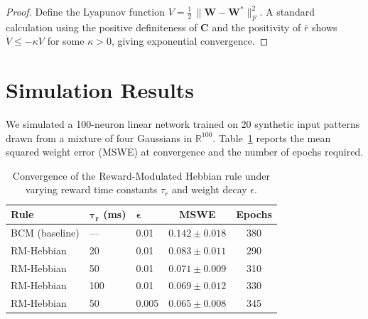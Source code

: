 \documentclass[12pt, a4paper, oneside]{report}
\theoremstyle{definition}
\theoremstyle{remark}
\begin{document}
\begin{proof}
Define the Lyapunov function $V = \tfrac{1}{2}\,\lVert \mathbf{W} - \mathbf{W}^* \rVert_F^2$.
A standard calculation using the positive definiteness of $\mathbf{C}$ and the
positivity of $\bar{r}$ shows $\dot{V} \leq -\kappa V$ for some $\kappa > 0$, giving
exponential convergence.
\end{proof}

\section{Simulation Results}

We simulated a 100-neuron linear network trained on 20 synthetic input patterns drawn
from a mixture of four Gaussians in $\mathbb{R}^{100}$.  Table~\ref{tab:hebbian-results}
reports the mean squared weight error (MSWE) at convergence and the number of epochs
required.

\begin{table}[H]
\centering
\caption{Convergence of the Reward-Modulated Hebbian rule under varying reward time
  constants $\tau_r$ and weight decay $\epsilon$.}
\label{tab:hebbian-results}
\setlength{\arrayrulewidth}{0.5pt}
\begin{tabularx}{0.86\linewidth}{@{}lllcc@{}}
\toprule
\textbf{Rule} & $\boldsymbol{\tau_r}$ (ms) & $\boldsymbol{\epsilon}$
  & \textbf{MSWE} & \textbf{Epochs} \\
\midrule
BCM (baseline)         & ---    & 0.01  & $0.142 \pm 0.018$ & 380 \\
RM-Hebbian             & 20     & 0.01  & $0.083 \pm 0.011$ & 290 \\
RM-Hebbian             & 50     & 0.01  & $0.071 \pm 0.009$ & 310 \\
RM-Hebbian             & 100    & 0.01  & $0.069 \pm 0.012$ & 330 \\
RM-Hebbian             & 50     & 0.005 & $0.065 \pm 0.008$ & 345 \\
\bottomrule
\end{tabularx}
\end{table}
\end{document}
